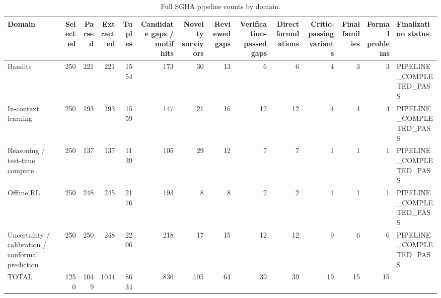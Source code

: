 \begin{table}[htbp]
\centering
\caption{Full SGHA pipeline counts by domain.}
\label{tab:full\_pipeline\_counts}
\begin{tabular}{lrrrrrrrrrrrrl}
\toprule
Domain & Selected & Parsed & Extracted & Tuples & Candidate gaps / motif hits & Novelty survivors & Reviewed gaps & Verification-passed gaps & Direct formulations & Critic-passing variants & Final families & Formal problems & Finalization status \\
\midrule
Bandits & 250 & 221 & 221 & 1554 & 173 & 30 & 13 & 6 & 6 & 4 & 3 & 3 & PIPELINE\_COMPLETED\_PASS \\
In-context learning & 250 & 193 & 193 & 1559 & 147 & 21 & 16 & 12 & 12 & 4 & 4 & 4 & PIPELINE\_COMPLETED\_PASS \\
Reasoning / test-time compute & 250 & 137 & 137 & 1139 & 105 & 29 & 12 & 7 & 7 & 1 & 1 & 1 & PIPELINE\_COMPLETED\_PASS \\
Offline RL & 250 & 248 & 245 & 2176 & 193 & 8 & 8 & 2 & 2 & 1 & 1 & 1 & PIPELINE\_COMPLETED\_PASS \\
Uncertainty / calibration / conformal prediction & 250 & 250 & 248 & 2206 & 218 & 17 & 15 & 12 & 12 & 9 & 6 & 6 & PIPELINE\_COMPLETED\_PASS \\
TOTAL & 1250 & 1049 & 1044 & 8634 & 836 & 105 & 64 & 39 & 39 & 19 & 15 & 15 &  \\
\bottomrule
\end{tabular}
\end{table}
